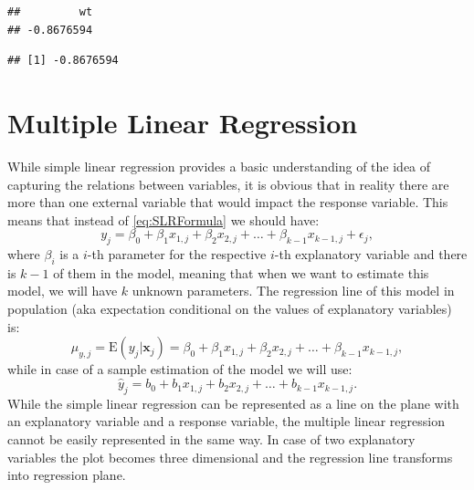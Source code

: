 \documentclass[
]{book}
\newenvironment{Shaded}{\begin{snugshade}}{\end{snugshade}}
\newcommand{\KeywordTok}[1]{\textcolor[rgb]{0.13,0.29,0.53}{\textbf{#1}}}
\newcommand{\NormalTok}[1]{#1}
\newcommand{\OperatorTok}[1]{\textcolor[rgb]{0.81,0.36,0.00}{\textbf{#1}}}
\theoremstyle{definition}
\theoremstyle{definition}
\theoremstyle{definition}
\theoremstyle{definition}
\theoremstyle{remark}
\begin{document}
\begin{verbatim}
##         wt 
## -0.8676594
\end{verbatim}

\begin{Shaded}
\end{Shaded}

\begin{verbatim}
## [1] -0.8676594
\end{verbatim}

\hypertarget{linearRegression}{%
\chapter{Multiple Linear Regression}\label{linearRegression}}

While simple linear regression provides a basic understanding of the idea of capturing the relations between variables, it is obvious that in reality there are more than one external variable that would impact the response variable. This means that instead of \eqref{eq:SLRFormula} we should have:
\begin{equation}
    y_j = \beta_0 + \beta_1 x_{1,j} + \beta_2 x_{2,j} + \dots + \beta_{k-1} x_{k-1,j} + \epsilon_j ,
    \label{eq:MLRFormula}
\end{equation}
where \(\beta_i\) is a \(i\)-th parameter for the respective \(i\)-th explanatory variable and there is \(k-1\) of them in the model, meaning that when we want to estimate this model, we will have \(k\) unknown parameters. The regression line of this model in population (aka expectation conditional on the values of explanatory variables) is:
\begin{equation}
    \mu_{y,j} = \mathrm{E}(y_j | \mathbf{x}_j) = \beta_0 + \beta_1 x_{1,j} + \beta_2 x_{2,j} + \dots + \beta_{k-1} x_{k-1,j} ,
    \label{eq:MLRExpectation}
\end{equation}
while in case of a sample estimation of the model we will use:
\begin{equation}
    \hat{y}_j = b_0 + b_1 x_{1,j} + b_2 x_{2,j} + \dots + b_{k-1} x_{k-1,j} .
    \label{eq:MLRExpectationSample}
\end{equation}
While the simple linear regression can be represented as a line on the plane with an explanatory variable and a response variable, the multiple linear regression cannot be easily represented in the same way. In case of two explanatory variables the plot becomes three dimensional and the regression line transforms into regression plane.
\end{document}
